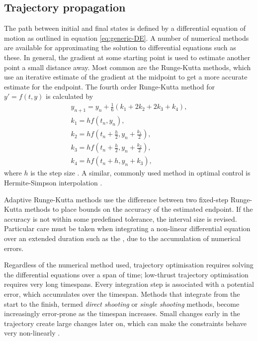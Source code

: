 \subsection{Trajectory propagation} \label{sub:Propagation}
The path between initial and final states is defined by a differential equation of motion as outlined in equation \eqref{eq:generic-DE}. A number of numerical methods are available for approximating the solution to differential equations such as these. In general, the gradient at some starting point is used to estimate another point a small distance away. Most common are the Runge-Kutta methods, which use an iterative estimate of the gradient at the midpoint to get a more accurate estimate for the endpoint. The fourth order Runge-Kutta method for $y'=f(t,y)$ is calculated by
\begin{subequations} \label{eq:RK4}
\begin{gather}
y_{n+1}=y_n+\frac{1}{6}\left(k_1+2k_2+2k_3+k_4\right), \\
k_1=hf\left(t_n,y_n\right), \\
k_2=hf\left(t_n+\frac{h}{2},y_n+\frac{k_1}{2}\right), \\
k_3=hf\left(t_n+\frac{h}{2},y_n+\frac{k_2}{2}\right), \\
k_4=hf\left(t_n+h,y_n+k_3\right),
\end{gather}
\end{subequations}
where $h$ is the step size \parencite[p. 797]{Kreyszig1979}%
. A similar, commonly used method in optimal control is Hermite-Simpson interpolation \parencite[p. 197]{Kreyszig1979}%
.

Adaptive Runge-Kutta methods use the difference between two fixed-step Runge-Kutta methods to place bounds on the accuracy of the estimated endpoint. If the accuracy is not within some predefined tolerance, the interval size is revised. Particular care must be taken when integrating a non-linear differential equation over an extended duration such as the \BW, due to the accumulation of numerical errors.


Regardless of the numerical method used, trajectory optimisation requires solving the differential equations over a span of time; low-thrust trajectory optimisation requires very long timespans. Every integration step is associated with a potential error, which accumulates over the timespan. Methods that integrate from the start to the finish, termed \emph{direct shooting} or \emph{single shooting} methods, become increasingly error-prone as the timespan increases. Small changes early in the trajectory create large changes later on, which can make the constraints behave very non-linearly \parencite{Betts1998}. 

